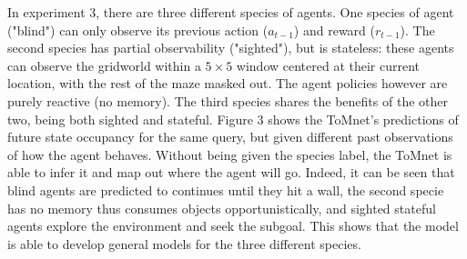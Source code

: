 \documentclass[twocolumn,superscriptaddress,aps]{revtex4-1}
\begin{document}
In experiment 3, there are three different species of agents. One species of agent ("blind") can only observe its previous action ($a_{t-1}$) and reward ($r_{t-1}$). The second species has partial observability ("sighted"), but is stateless: these agents can observe the gridworld within a $5 \times 5$ window centered at their current location, with the rest of the maze masked out. The agent policies however are purely reactive (no memory). The third species shares the benefits of the other two, being both sighted and stateful. Figure 3 shows the ToMnet's predictions of future state occupancy for the same query, but given different past observations of how the agent behaves. Without being given the species label, the ToMnet is able to infer it and map out where the agent will go. Indeed, it can be seen that blind agents are predicted to continues until they hit a wall, the second specie has no memory thus consumes objects opportunistically, and sighted stateful agents explore the environment and seek the subgoal. This shows that the model is able to develop general models for the three different species.\\
\end{document}
